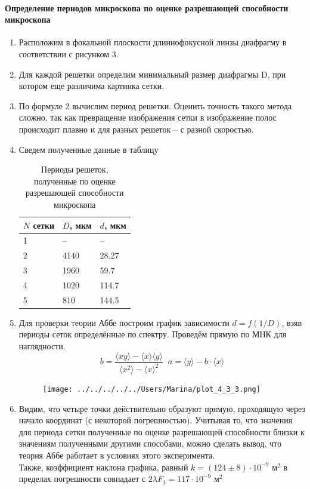 \documentclass[a4paper,12pt]{article}
\begin{document}
\paragraph{Определение периодов микроскопа по оценке разрешающей способности микроскопа}
\begin{enumerate}
\itemsep0em
\item Расположим в фокальной плоскости длиннофокусной линзы диафрагму в соответствии с рисунком 3.  
\item Для каждой решетки определим минимальный размер диафрагмы D, при котором еще различима картинка сетки.
\item По формуле 2  вычислим период решетки. Оценить точность такого метода сложно, так как превращение изображения сетки в изображение полос происходит плавно и для разных решеток -- с разной скоростью.
\item Сведем полученные данные в таблицу
\begin{table}[h!]
\centering
\begin{tabular}{|l|l|l|}
\hline
$N$ сетки & $D$, мкм & $d$, мкм \\ \hline
1   & --        & --        \\ \hline
2   & 4140     & 28.27       \\ \hline
3   & 1960     & 59.7      \\ \hline
4   & 1020     & 114.7      \\ \hline
5   & 810      & 144.5      \\ \hline
\end{tabular}
\caption{Периоды решеток, полученные по оценке разрешающей способности микроскопа}
\label{tab:3met}
\end{table} 
\item Для проверки теории Аббе построим график зависимости $d = f(1/D)$, взяв периоды сеток определённые по спектру. Проведём прямую по МНК для наглядности.
\begin{equation*}
b = \frac{\langle xy \rangle - \langle x \rangle \langle y \rangle}{\langle x^2 \rangle - \langle x \rangle^2} \;\;
a = \langle y \rangle - b \cdot \langle x \rangle
		\end{equation*}
\begin{figure}[h!]
\centering
\texttt{[image: ../../../../../Users/Marina/plot\_4\_3\_3.png]} 
\end{figure}
\item Видим, что четыре точки действительно образуют прямую, проходящую через начало координат (с некоторой погрешностью). Учитывая то, что значения для периода сетки полученные по оценке разрешающей способности близки к значениям полученными другими способами, можно сделать вывод, что теория Аббе работает в условиях этого эксперимента.\\
Также, коэффициент наклона графика, равный $k = (124 \pm 8)\cdot 10^{-9}$ м$^2$ в пределах погрешности совпадает с $2\lambda F_1 = 117\cdot 10^{-9}$ м$^2$
\end{enumerate}
\end{document}
